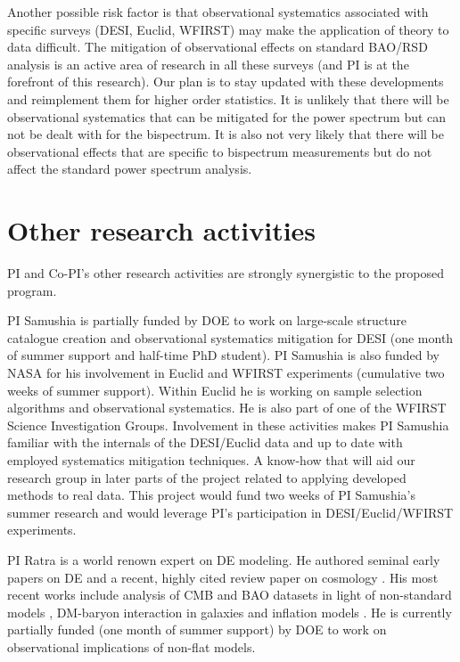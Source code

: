 Another possible risk factor is that observational systematics associated with
specific surveys (DESI, Euclid, WFIRST) may make the application of theory to
data difficult. The mitigation of observational effects on standard BAO/RSD
analysis is an active area of research in all these surveys (and PI is at the
forefront of this research). Our plan is to stay updated with these
developments and reimplement them for higher order statistics. It is unlikely
that there will be observational systematics that can be mitigated for the
power spectrum but can not be dealt with for the bispectrum. It is also not
very likely that there will be observational effects that are specific to
bispectrum measurements but do not affect the standard power spectrum analysis.

\section{Other research activities}

PI and Co-PI's other research activities are strongly synergistic to the
proposed program.

PI Samushia is partially funded by DOE to work on large-scale structure
catalogue creation and observational systematics mitigation for DESI (one month of
summer support and half-time PhD student). PI Samushia is also funded by NASA
for his involvement in Euclid and WFIRST experiments (cumulative two weeks of
summer support). Within Euclid he is working on sample selection algorithms
and observational systematics. He is also part of one of the WFIRST Science
Investigation Groups. Involvement in these activities makes PI Samushia
familiar with  the internals of the DESI/Euclid data and up to date with
employed systematics mitigation techniques. A know-how that will aid our
research group in later parts of the project related to applying  developed
methods to real data. This project would fund two weeks of PI Samushia's
summer research and would leverage PI's participation in
DESI/Euclid/WFIRST experiments.

PI Ratra is a world renown expert on DE modeling. He authored seminal early
papers on DE \cite{1988ApJ...325L..17P,1988PhRvD..37.3406R} and a
recent, highly cited review paper on cosmology \cite{2003RvMP...75..559P}.  His
most recent works include analysis of CMB and BAO datasets in light of
non-standard models
\cite{2018arXiv180305522P,2018arXiv180707421P,2018arXiv180903598P,2018MNRAS.479.4566M,2018MNRAS.480..759R},
DM-baryon interaction in galaxies \cite{2018arXiv180905938Y} and inflation
models \cite{2017PhRvD..96j3534R}. He is currently partially funded (one month
of summer support) by DOE to work on observational implications of non-flat
models.

